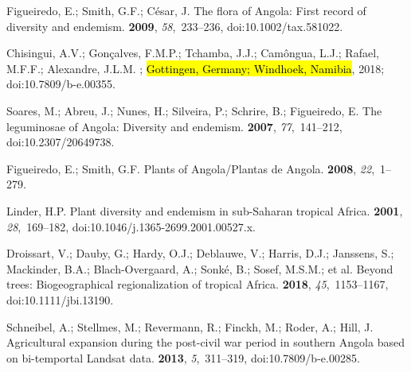 \documentclass[diversity,article,accept,moreauthors,pdftex]{Definitions/mdpi}
\begin{document}
\begin{thebibliography}{999}

Figueiredo, E.; Smith, G.F.; C{\'e}sar, J.
\newblock The flora of {Angola}: {First} record of diversity and endemism.
 {\bf 2009}, {\em 58},~233--236, doi:10.1002/tax.581022.

Chisingui, A.V.; Gon\c{c}alves, F.M.P.; Tchamba, J.J.; Cam{\^o}ngua, L.J.;
  Rafael, M.F.F.; Alexandre, J.L.M.
;
 \hl{Gottingen, Germany; Windhoek, Namibia},  2018; doi:10.7809/b-e.00355. %

Soares, M.; Abreu, J.; Nunes, H.; Silveira, P.; Schrire, B.; Figueiredo, E.
\newblock The leguminosae of {Angola}: {Diversity} and endemism.
 {\bf 2007}, {\em
  77},~141--212, doi:10.2307/20649738.

Figueiredo, E.; Smith, G.F.
\newblock Plants of {Angola}/{Plantas} de {Angola}.
 {\bf 2008}, {\em 22},~1--279.

Linder, H.P.
\newblock Plant diversity and endemism in {sub-Saharan} tropical {Africa}.
 {\bf 2001}, {\em 28},~169--182, doi:10.1046/j.1365-2699.2001.00527.x.

Droissart, V.; Dauby, G.; Hardy, O.J.; Deblauwe, V.; Harris, D.J.; Janssens,
  S.; Mackinder, B.A.; {Blach-Overgaard}, A.; Sonk{\'e}, B.; Sosef, M.S.M.;
 et al.
\newblock Beyond trees: {Biogeographical} regionalization of tropical {Africa}.
 {\bf 2018}, {\em 45},~1153--1167, doi:10.1111/jbi.13190.

Schneibel, A.; Stellmes, M.; Revermann, R.; Finckh, M.; R{\:o}der, A.; Hill, J.
\newblock Agricultural expansion during the post-civil war period in southern
  Angola based on bi-temportal {Landsat} data.
 {\bf 2013}, {\em 5},~311--319, doi:10.7809/b-e.00285.


\end{thebibliography}
\end{document}
